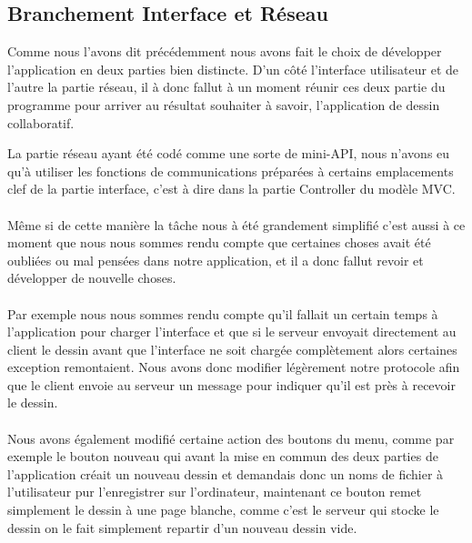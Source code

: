 \documentclass[a4paper,11pt]{article}
\begin{document}
\subsection{Branchement Interface et Réseau}
Comme nous l'avons dit précédemment nous avons fait le choix de développer l'application en deux parties bien distincte. D'un côté l'interface utilisateur et de l'autre la partie réseau, il à donc fallut à un moment réunir ces deux partie du programme pour arriver au résultat souhaiter à savoir, l'application de dessin collaboratif.

La partie réseau ayant été codé comme une sorte de mini-API, nous n'avons eu qu'à utiliser les fonctions de communications préparées à certains emplacements clef de la partie interface, c'est à dire dans la partie Controller du modèle MVC.

\paragraph{} Même si de cette manière la tâche nous à été grandement simplifié c'est aussi à ce moment que nous nous sommes rendu compte que certaines choses avait été oubliées ou mal pensées dans notre application, et il a donc fallut revoir et développer de nouvelle choses.

\paragraph{} Par exemple nous nous sommes rendu compte qu'il fallait un certain temps à l'application pour charger l'interface et que si le serveur envoyait directement au client le dessin avant que l'interface ne soit chargée complètement alors certaines exception remontaient. Nous avons donc modifier légèrement notre protocole afin que le client envoie au serveur un message pour indiquer qu'il est près à recevoir le dessin.

\paragraph{} Nous avons également modifié certaine action des boutons du menu, comme par exemple le bouton nouveau qui avant la mise en commun des deux parties de l'application créait un nouveau dessin et demandais donc un noms de fichier à l'utilisateur pur l'enregistrer sur l'ordinateur, maintenant ce bouton remet simplement le dessin à une page blanche, comme c'est le serveur qui stocke le dessin on le fait simplement repartir d'un nouveau dessin vide.
\end{document}
